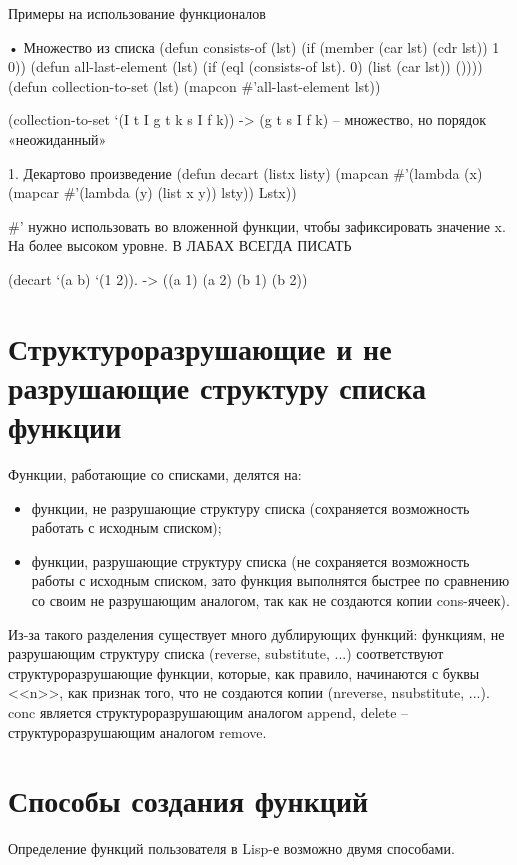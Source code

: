 \documentclass{article}
\begin{document}
Примеры на использование функционалов

•	Множество из списка
(defun consists-of (lst)
	(if (member (car lst) (cdr lst)) 1 0))
(defun all-last-element (lst)
	(if (eql (consists-of lst). 0) (list (car lst)) ())))
(defun collection-to-set (lst)
	(mapcon \#’all-last-element lst))

(collection-to-set ‘(I t I g t k s I f k)) -> (g t s I f k) – множество, но порядок «неожиданный»


1.	Декартово произведение
(defun decart (listx listy) 
	(mapcan \#’(lambda (x)
		(mapcar \#’(lambda (y)
			(list x y)) lsty))
				Lstx))

\#’ нужно использовать во вложенной функции, чтобы зафиксировать значение x. На более высоком уровне. В ЛАБАХ ВСЕГДА ПИСАТЬ

(decart ‘(a b) ‘(1 2)). -> ((a 1) (a 2) (b 1) (b 2))


\section*{Структуроразрушающие и не разрушающие структуру списка функции}

Функции, работающие со списками, делятся на:
\begin{itemize}
	\item функции, не разрушающие структуру списка (сохраняется возможность работать с исходным списком);
	\item функции, разрушающие структуру списка (не сохраняется возможность работы с исходным списком, зато функция выполнятся быстрее по сравнению со своим не разрушающим аналогом, так как не создаются копии cons-ячеек).
\end{itemize}

Из-за такого разделения существует много дублирующих функций: функциям, не разрушающим структуру списка (reverse, substitute, ...) соответствуют структуроразрушающие функции, которые, как правило, начинаются с буквы <<n>>, как признак того, что не создаются копии (nreverse, nsubstitute, ...). conc является структуроразрушающим аналогом append, delete -- структуроразрушающим аналогом remove.

\section*{Способы создания функций}

Определение функций пользователя в Lisp-е возможно двумя способами.
\end{document}
